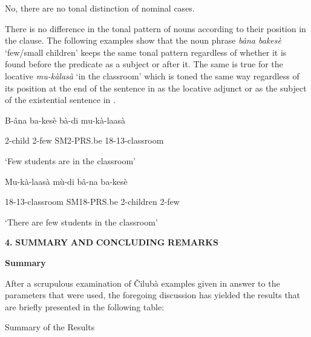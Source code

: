 \documentclass[output=paper]{langscibook}
\begin{document}
No, there are no tonal distinction of nominal cases.

There is no difference in the tonal pattern of nouns according to their position in the clause. The following examples show that the noun phrase \textit{bâna bakesè} ‘few/small children’ keeps the same tonal pattern regardless of whether it is found before the predicate as a subject or after it. The same is true for the locative \textit{mu-kàlasà} ‘in the classroom’ which is toned the same way regardless of its position at the end of the sentence in  as the locative adjunct or as the subject of the existential sentence in .

\ea%
    \label{ex:lukusa:90}
    \z

          B-âna    ba-kesè    bà-di        mu-kà-laasà

2-child  2-few      SM2-PRS.be  18-13-classroom

\glt ‘Few students are in the classroom’

\ea%
    \label{ex:lukusa:91}
    \z

           Mu-kà-laasà      mù-di        bâ-na     ba-kesè

18-13-classroom    SM18-PRS.be    2-children  2-few

\glt ‘There are few students in the classroom’

\textbf{4.} \textbf{SUMMARY} \textbf{AND} \textbf{CONCLUDING} \textbf{REMARKS}

\textbf{Summary}

After a scrupulous examination of Čilubà examples given in answer to the parameters that were used, the foregoing discussion has yielded the results that are briefly presented in the following table:

\ea%
    \label{ex:lukusa:92}
    \z

           Summary of the Results
\end{document}
